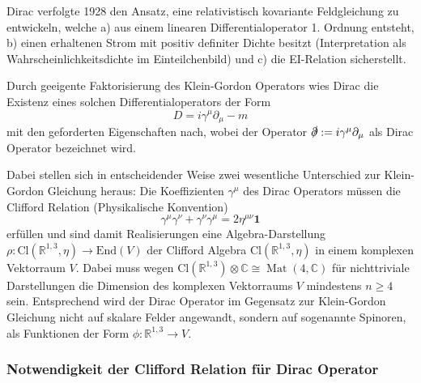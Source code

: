 \documentclass[10pt, letterpaper]{article}
\newcommand{\R}{\mathbb{R}}
\newcommand{\End}{\mathrm{End}}
\newcommand{\Cl}{\mathrm{Cl}}
\begin{document}
Dirac verfolgte 1928 den Ansatz, eine relativistisch kovariante Feldgleichung zu entwickeln, welche a) aus einem linearen Differentialoperator 1. Ordnung entsteht, b) einen erhaltenen Strom mit positiv definiter Dichte besitzt (Interpretation als Wahrscheinlichkeitsdichte im Einteilchenbild) und c) die EI-Relation sicherstellt. 

Durch geeigente Faktorisierung des Klein-Gordon Operators wies Dirac die Existenz eines solchen Differentialoperators der Form
$$D=i\gamma^\mu\partial_\mu -m$$
mit den geforderten Eigenschaften nach, wobei der Operator $\slashed{\partial}:=i\gamma^\mu\partial_\mu$ als Dirac Operator bezeichnet wird. 

Dabei stellen sich in entscheidender Weise zwei wesentliche Unterschied zur Klein-Gordon Gleichung heraus: Die Koeffizienten $\gamma^\mu$ des Dirac Operators müssen die Clifford Relation (Physikalische Konvention)
$$\gamma^\mu\gamma^\nu + \gamma^\nu \gamma^\mu= 2\eta^{\mu\nu}\mathbf{1}$$
erfüllen und sind damit Realisierungen eine Algebra-Darstellung $\rho: \Cl(\R^{1,3},\eta)\to \End(V)$ der Clifford Algebra $\Cl(\R^{1,3},\eta)$ in einem komplexen Vektorraum $V$. Dabei muss wegen $\mathrm{Cl}\left(\mathbb{R}^{1,3}\right) \otimes \mathbb{C} \cong \operatorname{Mat}(4, \mathbb{C})$ für nichttriviale Darstellungen die Dimension des komplexen Vektorraums $V$ mindestens $n\geq 4$ sein. Entsprechend wird der Dirac Operator im Gegensatz zur Klein-Gordon Gleichung nicht auf skalare Felder angewandt, sondern auf sogenannte Spinoren, als Funktionen der Form $\phi:\R^{1,3}\to V$. 

\subsubsection{Notwendigkeit der Clifford Relation für Dirac Operator}
\end{document}
